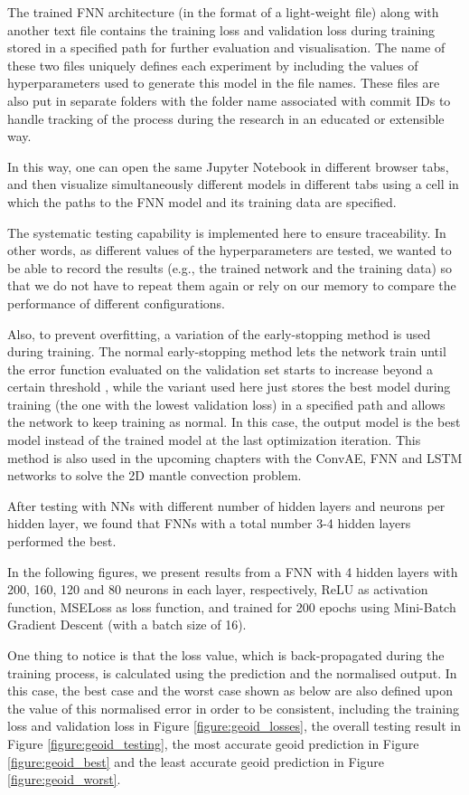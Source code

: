 The trained FNN architecture (in the format of a light-weight file) along with another text file contains the training loss and validation loss during training stored in a specified path for further evaluation and visualisation. The name of these two files uniquely defines each experiment by including the values of hyperparameters used to generate this model in the file names. These files are also put in separate folders with the folder name associated with commit IDs to handle tracking of the process during the research in an educated or extensible way.

In this way, one can open the same Jupyter Notebook in different browser tabs, and then visualize simultaneously different models in different tabs using a cell in which the paths to the FNN model and its training data are specified. 

The systematic testing capability is implemented here to ensure traceability. In other words, as different values of the hyperparameters are tested, we wanted to be able to record the results (e.g., the trained network and the training data) so that we do not have to repeat them again or rely on our memory to compare the performance of different configurations.

Also, to prevent overfitting, a variation of the early-stopping method is used during training. The normal early-stopping method lets the network train until the error function evaluated on the validation set starts to increase beyond a certain threshold \citep{10.1007_978-3-642-35289-8_5}, while the variant used here just stores the best model during training (the one with the lowest validation loss) in a specified path and allows the network to keep training as normal. In this case, the output model is the best model instead of the trained model at the last optimization iteration. This method is also used in the upcoming chapters with the ConvAE, FNN and LSTM networks to solve the 2D mantle convection problem.

After testing with NNs with different number of hidden layers and neurons per hidden layer, we found that FNNs with a total number 3-4 hidden layers performed the best.

In the following figures, we present results from a FNN with 4 hidden layers with 200, 160, 120 and 80 neurons in each layer, respectively, ReLU as activation function, MSELoss as loss function, and trained for 200 epochs using Mini-Batch Gradient Descent (with a batch size of 16).

One thing to notice is that the loss value, which is back-propagated during the training process, is calculated using the prediction and the normalised output. In this case, the best case and the worst case shown as below are also defined upon the value of this normalised error in order to be consistent, including the training loss and validation loss in Figure \ref{figure:geoid_losses}, the overall testing result in Figure \ref{figure:geoid_testing},  the most accurate geoid prediction in Figure \ref{figure:geoid_best} and the least accurate geoid prediction in Figure \ref{figure:geoid_worst}.

